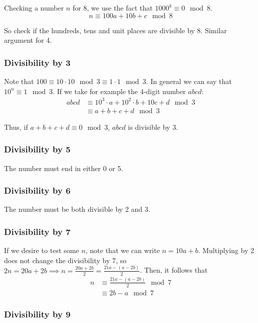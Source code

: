 Checking a number $n$ for 8, we use the fact that $1000^k\equiv 0\mod 8$.
\begin{equation*}
    n\equiv 100a + 10b + c\mod 8
\end{equation*}

So check if the hundreds, tens and unit places are divisible by 8. Similar argument for 4.

\subsubsection{Divisibility by 3}

Note that $100\equiv 10\cdot 10\mod 3\equiv 1\cdot 1\mod 3$. In
general we can say that $10^n\equiv 1\mod 3$. If we take for example
the 4-digit number $abcd$:
\begin{align*}
    abcd&\equiv 10^3\cdot a + 10^2\cdot b + 10c + d\mod 3\\
    &\equiv a+b+c+d\mod 3
\end{align*}

Thus, if $a+b+c+d\equiv 0\mod 3$, $abcd$ is divisible by 3.

\subsubsection{Divisibility by 5}

The number must end in either 0 or 5.

\subsubsection{Divisibility by 6}

The number must be both divisible by 2 and 3.

\subsubsection{Divisibility by 7}

If we desire to test some $n$, note that we can write $n=10a+b$.
Multiplying by 2 does not change the divisibility by 7, so
$2n=20a+2b\implies n = \frac{20a+2b}{2}=\frac{21a - (a - 2b)}{2}$.
Then, it follows that
\begin{align*}
    n&\equiv \frac{21a - (a - 2b)}{2}\mod 7\\
    &\equiv 2b-a\mod 7
\end{align*}

\subsubsection{Divisibility by 9}

